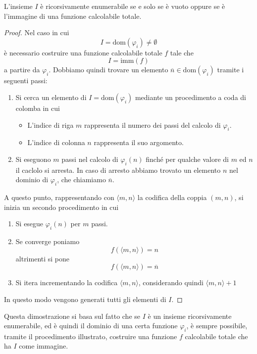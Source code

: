 \begin{theorem}
	L'insieme $I$ è ricorsivamente enumerabile se e solo se è
	vuoto oppure se è l'immagine di una funzione calcolabile
	totale.
	\begin{proof}
		Nel caso in cui
		\[ I = \text{dom}(\varphi_i) \neq \emptyset \]
		è necessario costruire una funzione calcolabile totale
		$f$ tale che
		\[ I = \text{imm}(f) \]
		a partire da $\varphi_i$. Dobbiamo quindi trovare un
		elemento $\overline{n} \in \text{dom}(\varphi_i)$
		tramite i seguenti passi:
		\begin{enumerate}
			\item Si cerca un elemento di
			      $I = \text{dom}(\varphi_i)$ mediante un
			      procedimento a coda di colomba in cui
			      \begin{itemize}
				      \item L'indice di riga $m$ rappresenta il
				            numero dei passi del calcolo di
				            $\varphi_i$.
				      \item L'indice di colonna $n$ rappresenta
				            il suo argomento.
			      \end{itemize}
			\item Si eseguono $m$ passi nel calcolo di
			      $\varphi_i(n)$ finché per qualche valore di
			      $m$ ed $n$ il caclolo si arresta. In caso di
			      arresto abbiamo trovato un elemento $n$ nel
			      dominio di $\varphi_i$, che chiamiamo
			      $\overline{n}$.
		\end{enumerate}
		A questo punto, rappresentando con $\langle m,n \rangle$
		la codifica della coppia $(m, n)$, si inizia un secondo
		procedimento in cui
		\begin{enumerate}
			\item Si esegue $\varphi_i (n)$ per $m$ passi.
			\item Se converge poniamo
			      \[ f(\langle m,n \rangle) = n \]
			      altrimenti si pone
			      \[ f(\langle m,n \rangle) = \overline{n} \]
			\item Si itera incrementando la codifica
			      $\langle m,n \rangle$, considerando quindi
			      $\langle m,n \rangle + 1$
		\end{enumerate}
		In questo modo vengono generati tutti gli elementi di
		$I$.
	\end{proof}
\end{theorem}

Questa dimostrazione si basa sul fatto che se $I$ è un insieme
ricorsivamente enumerabile, ed è quindi il dominio di una certa
funzione $\varphi_i$, è sempre possibile, tramite il procedimento
illustrato, costruire una funzione $f$ calcolabile totale che ha
$I$ come immagine.

